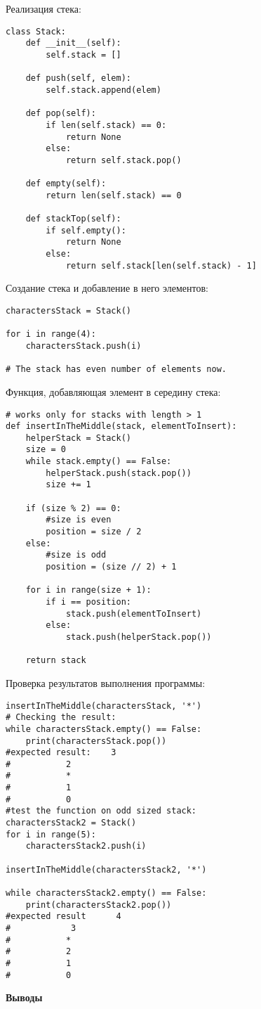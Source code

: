 \documentclass[12pt]{article}
\begin{document}
Реализация стека:
\begin{verbatim}
class Stack: 
	def __init__(self):
		self.stack = []

	def push(self, elem):
		self.stack.append(elem)

	def pop(self):
		if len(self.stack) == 0:
			return None
		else:
			return self.stack.pop()

	def empty(self):
		return len(self.stack) == 0

	def stackTop(self):
		if self.empty():
			return None
		else:
			return self.stack[len(self.stack) - 1]
\end{verbatim}

Создание стека и добавление в него элементов:
\begin{verbatim}
charactersStack = Stack()

for i in range(4):
	charactersStack.push(i)

# The stack has even number of elements now.
\end{verbatim}
\pagebreak
Функция, добавляющая элемент в середину стека:
\begin{verbatim}
# works only for stacks with length > 1
def insertInTheMiddle(stack, elementToInsert):
	helperStack = Stack()
	size = 0
	while stack.empty() == False:
		helperStack.push(stack.pop())
		size += 1

	if (size % 2) == 0:
		#size is even
		position = size / 2
	else:
		#size is odd
		position = (size // 2) + 1

	for i in range(size + 1):
		if i == position:
			stack.push(elementToInsert)
		else:
			stack.push(helperStack.pop())
	
	return stack
\end{verbatim}
Проверка результатов выполнения программы:
\begin{verbatim}
insertInTheMiddle(charactersStack, '*')
# Checking the result:
while charactersStack.empty() == False:
	print(charactersStack.pop())
#expected result:	 3
# 			2
# 			*
# 			1
# 			0
#test the function on odd sized stack:
charactersStack2 = Stack()
for i in range(5):
	charactersStack2.push(i)

insertInTheMiddle(charactersStack2, '*')

while charactersStack2.empty() == False:
	print(charactersStack2.pop())
#expected result	  4
#			 3
# 			*
# 			2
# 			1
# 			0
\end{verbatim}
\pagebreak
\textbf{Выводы}
\end{document}
